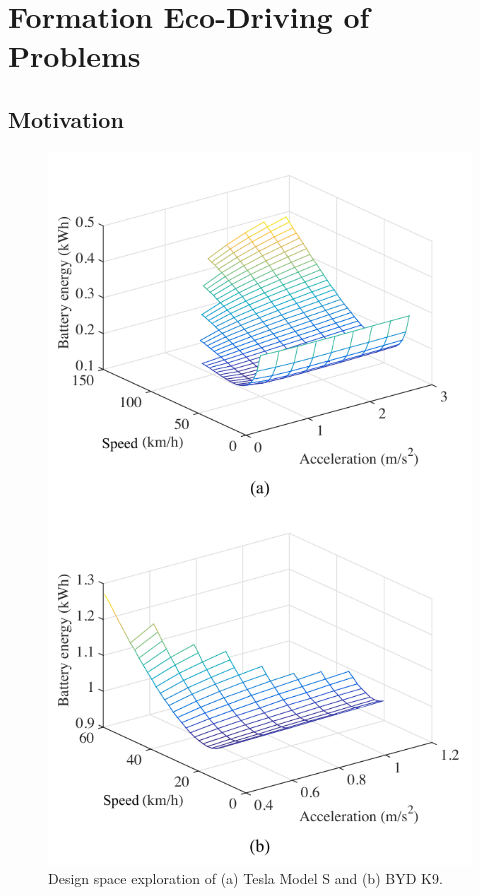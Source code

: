 \documentclass{IEEEtran}
\begin{document}
\section{Formation Eco-Driving of Problems}\label{sec:problem}

\subsection{Motivation}

\begin{figure}	%
\centering
\includegraphics[width=0.9\hsize]{Figures/DSE.pdf}
\caption{Design space exploration of (a) Tesla Model S and (b) BYD K9.}
\label{fig:DSE}
\end{figure} 
\end{document}
